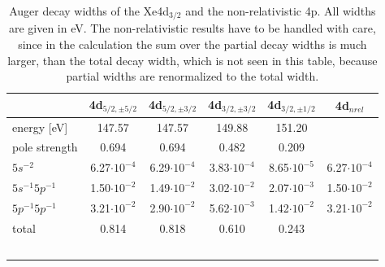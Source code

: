 \begin{table}[h]
 \centering
 \caption{Auger decay widths of the Xe4d$_{3/2}$ and the non-relativistic
          4p. All widths are given in \unit{eV}. The non-relativistic
          results have to be handled with care, since in the calculation
          the sum over the partial decay widths is much larger, than the
          total decay width, which is not seen in this table, because
          partial widths are renormalized to the total width.}
 \begin{tabular}{lccccc}
   \toprule
                      & 4d$_{5/2,\pm 5/2}$ & 4d$_{5/2,\pm 3/2}$ & 4d$_{3/2,\pm 3/2}$ & 4d$_{3/2,\pm 1/2}$& 4d$_{nrel}$ \\
   \midrule                                                                                     
   energy [\unit{eV}] &   147.57           &    147.57          &  149.88        &   151.20   & \\
   pole strength      &     0.694          &      0.694         &    0.482       &     0.209  & \\
   \midrule                                                                                    
   $5s^{-2}$          & 6.27$\cdot10^{-4}$ & 6.29$\cdot10^{-4}$ & 3.83$\cdot10^{-4}$ & 8.65$\cdot10^{-5}$ & 6.27$\cdot10^{-4}$\\
   $5s^{-1}5p^{-1}$   & 1.50$\cdot10^{-2}$ & 1.49$\cdot10^{-2}$ & 3.02$\cdot10^{-2}$ & 2.07$\cdot10^{-3}$ & 1.50$\cdot10^{-2}$\\
   $5p^{-1}5p^{-1}$   & 3.21$\cdot10^{-2}$ & 2.90$\cdot10^{-2}$ & 5.62$\cdot10^{-3}$ & 1.42$\cdot10^{-2}$ & 3.21$\cdot10^{-2}$\\
   \midrule
   total              &   0.814            &   0.818            &  0.610         &   0.243    &\ \\
   \bottomrule                                                                                 \
 \end{tabular}                                                                                 \
 \label{table:xe_auger_rest}
\end{table}


